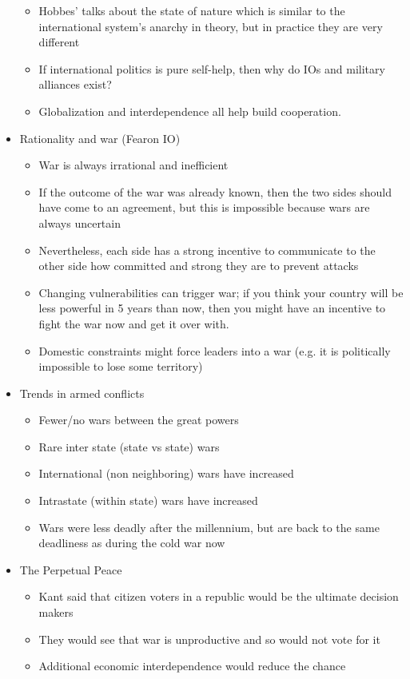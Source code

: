 \documentclass[11pt]{article}
\begin{document}
\begin{itemize}
\begin{itemize}
\item Hobbes' talks about the state of nature which is similar to the
international system's anarchy in theory, but in practice they are very different
\item If international politics is pure self-help, then why do IOs and military
alliances exist?
\item Globalization and interdependence all help build cooperation.
\end{itemize}
\item Rationality and war (Fearon IO)
\begin{itemize}
\item War is always irrational and inefficient
\item If the outcome of the war was already known, then the two sides
should have come to an agreement, but this is impossible because wars are
always uncertain
\item Nevertheless, each side has a strong incentive to communicate to the other
side how committed and strong they are to prevent attacks
\item Changing vulnerabilities can trigger war; if you think your country will be
less powerful in 5 years than now, then you might have an incentive to fight
the war now and get it over with.
\item Domestic constraints might force leaders into a war (e.g. it is politically
impossible to lose some territory)
\end{itemize}
\item Trends in armed conflicts
\begin{itemize}
\item Fewer/no wars between the great powers
\item Rare inter state (state vs state) wars
\item International (non neighboring) wars have increased
\item Intrastate (within state) wars have increased
\item Wars were less deadly after the millennium, but are back to the same
deadliness as during the cold war now
\end{itemize}
\item The Perpetual Peace
\begin{itemize}
\item Kant said that citizen voters in a republic would be the ultimate decision makers
\item They would see that war is unproductive and so would not vote for it
\item Additional economic interdependence would reduce the chance

\end{itemize}
\end{itemize}
\end{document}
